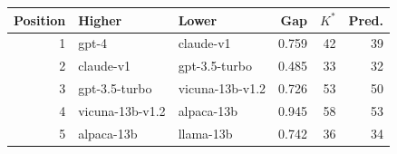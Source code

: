 \begin{tabular}{rllrrr}
\toprule
Position & Higher & Lower & Gap & $K^*$ & Pred. \\
\midrule
1 & gpt-4 & claude-v1 & 0.759 & 42 & 39 \\
2 & claude-v1 & gpt-3.5-turbo & 0.485 & 33 & 32 \\
3 & gpt-3.5-turbo & vicuna-13b-v1.2 & 0.726 & 53 & 50 \\
4 & vicuna-13b-v1.2 & alpaca-13b & 0.945 & 58 & 53 \\
5 & alpaca-13b & llama-13b & 0.742 & 36 & 34 \\
\bottomrule
\end{tabular}
